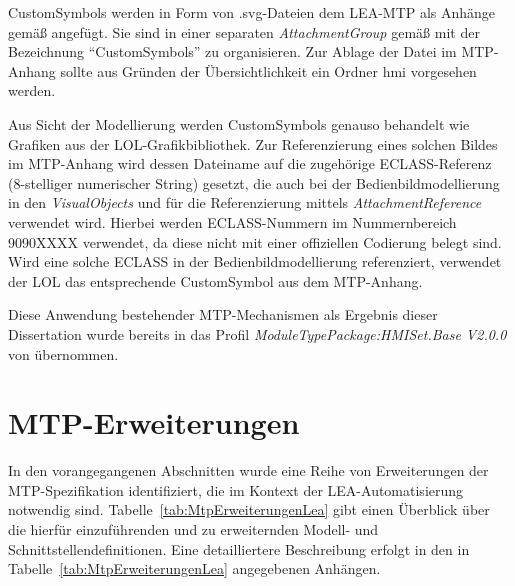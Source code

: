 CustomSymbols werden in Form von .svg-Dateien dem LEA-MTP als Anhänge gemäß \cite{PNO.2025.Part1} angefügt. Sie sind in einer separaten \emph{AttachmentGroup} gemäß \cite{PNO.2025.Part1} mit der Bezeichnung \enquote{CustomSymbols} zu organisieren. Zur Ablage der Datei im MTP-Anhang sollte aus Gründen der Übersichtlichkeit ein Ordner \gls{hmi} vorgesehen werden. 

Aus Sicht der Modellierung werden CustomSymbols genauso behandelt wie Grafiken aus der LOL-Grafikbibliothek. Zur Referenzierung eines solchen Bildes im MTP-Anhang wird dessen Dateiname auf die zugehörige ECLASS-Referenz (8-stelliger numerischer String) gesetzt, die auch bei der Bedienbildmodellierung in den \emph{VisualObjects} und für die Referenzierung mittels \emph{AttachmentReference} verwendet wird. Hierbei werden ECLASS-Nummern im Nummernbereich 9090XXXX verwendet, da diese nicht mit einer offiziellen Codierung belegt sind. Wird eine solche ECLASS in der Bedienbildmodellierung referenziert, verwendet der LOL das entsprechende CustomSymbol aus dem MTP-Anhang.

Diese Anwendung bestehender MTP-Mechanismen als Ergebnis dieser Dissertation wurde bereits in das Profil \emph{ModuleTypePackage:HMISet.Base V2.0.0} von \cite{PNO.2025.Part2} übernommen.

\section{MTP-Erweiterungen}
\label{sec:MTPErweiterungenLEA}

In den vorangegangenen Abschnitten wurde eine Reihe von Erweiterungen der MTP-Spezifikation identifiziert, die im Kontext der LEA-Automatisierung notwendig sind. Tabelle~\ref{tab:MtpErweiterungenLea} gibt einen Überblick über die hierfür einzuführenden und zu erweiternden Modell- und Schnittstellendefinitionen. Eine detailliertere Beschreibung erfolgt in den in Tabelle~\ref{tab:MtpErweiterungenLea} angegebenen Anhängen.

